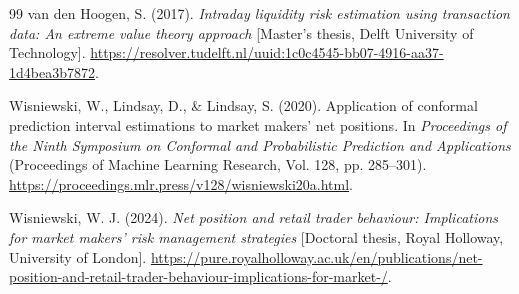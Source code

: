 \documentclass[11pt,a4paper]{article}
\begin{document}
\begin{thebibliography}{99}
 van den Hoogen, S. (2017). \emph{Intraday liquidity risk estimation using transaction data: An extreme value theory approach} [Master's thesis, Delft University of Technology]. \url{https://resolver.tudelft.nl/uuid:1c0c4545-bb07-4916-aa37-1d4bea3b7872}.

 Wisniewski, W., Lindsay, D., \& Lindsay, S. (2020). Application of conformal prediction interval estimations to market makers' net positions. In \emph{Proceedings of the Ninth Symposium on Conformal and Probabilistic Prediction and Applications} (Proceedings of Machine Learning Research, Vol. 128, pp. 285--301). \url{https://proceedings.mlr.press/v128/wisniewski20a.html}.

 Wisniewski, W. J. (2024). \emph{Net position and retail trader behaviour: Implications for market makers' risk management strategies} [Doctoral thesis, Royal Holloway, University of London]. \url{https://pure.royalholloway.ac.uk/en/publications/net-position-and-retail-trader-behaviour-implications-for-market-/}.
\end{thebibliography}
\end{document}

